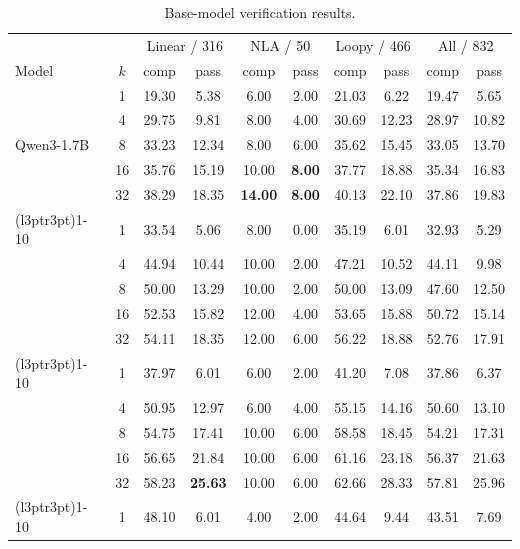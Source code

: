 \begin{table}[H]
\centering
\small
\caption{Base-model verification results.}
\label{tab:probe-complete}
\begin{tabular}{lccccccccc}
\toprule
\rowcolor{algobg}
& & \multicolumn{2}{c}{Linear / 316} & \multicolumn{2}{c}{NLA / 50}
  & \multicolumn{2}{c}{Loopy / 466} & \multicolumn{2}{c}{All / 832} \\
\headercmidrules{\cmidrule(lr){3-4}\cmidrule(lr){5-6}\cmidrule(lr){7-8}\cmidrule(lr){9-10}}
\rowcolor{algobg}
Model & \(k\) & comp & pass & comp & pass & comp & pass & comp & pass \\
\midrule
\multirow{5}{*}{Qwen3-1.7B}
 & 1  & 19.30 & 5.38 & 6.00 & 2.00 & 21.03 & 6.22 & 19.47 & 5.65 \\
 & 4  & 29.75 & 9.81 & 8.00 & 4.00 & 30.69 & 12.23 & 28.97 & 10.82 \\
 & 8  & 33.23 & 12.34 & 8.00 & 6.00 & 35.62 & 15.45 & 33.05 & 13.70 \\
 & 16 & 35.76 & 15.19 & 10.00 & \textbf{8.00} & 37.77 & 18.88 & 35.34 & 16.83 \\
 & 32 & 38.29 & 18.35 & \textbf{14.00} & \textbf{8.00} & 40.13 & 22.10 & 37.86 & 19.83 \\
\cmidrule(l{3pt}r{3pt}){1-10}
\multirow{5}{*}{Qwen3-4B}
 & 1  & 33.54 & 5.06 & 8.00 & 0.00 & 35.19 & 6.01 & 32.93 & 5.29 \\
 & 4  & 44.94 & 10.44 & 10.00 & 2.00 & 47.21 & 10.52 & 44.11 & 9.98 \\
 & 8  & 50.00 & 13.29 & 10.00 & 2.00 & 50.00 & 13.09 & 47.60 & 12.50 \\
 & 16 & 52.53 & 15.82 & 12.00 & 4.00 & 53.65 & 15.88 & 50.72 & 15.14 \\
 & 32 & 54.11 & 18.35 & 12.00 & 6.00 & 56.22 & 18.88 & 52.76 & 17.91 \\
\cmidrule(l{3pt}r{3pt}){1-10}
\multirow{5}{*}{Qwen3-8B}
 & 1  & 37.97 & 6.01 & 6.00 & 2.00 & 41.20 & 7.08 & 37.86 & 6.37 \\
 & 4  & 50.95 & 12.97 & 6.00 & 4.00 & 55.15 & 14.16 & 50.60 & 13.10 \\
 & 8  & 54.75 & 17.41 & 10.00 & 6.00 & 58.58 & 18.45 & 54.21 & 17.31 \\
 & 16 & 56.65 & 21.84 & 10.00 & 6.00 & 61.16 & 23.18 & 56.37 & 21.63 \\
 & 32 & 58.23 & \textbf{25.63} & 10.00 & 6.00 & 62.66 & 28.33 & 57.81 & 25.96 \\
\cmidrule(l{3pt}r{3pt}){1-10}
\multirow{5}{*}{Qwen3-14B}
 & 1  & 48.10 & 6.01 & 4.00 & 2.00 & 44.64 & 9.44 & 43.51 & 7.69 \\

\end{tabular}
\end{table}
